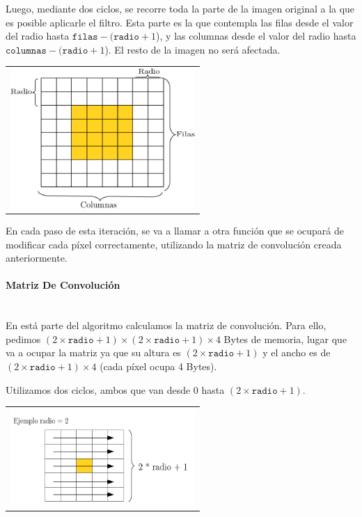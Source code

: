       Luego, mediante dos ciclos, se recorre toda la parte de la imagen original a la que es posible aplicarle el filtro. Esta parte es la que contempla las filas desde el valor del radio hasta $\mathtt{filas} - (\mathtt{radio} + 1$), y las columnas desde el valor del radio hasta $\mathtt{columnas} - (\mathtt{radio} + 1$). El resto de la imagen no será afectada. 

        {\centering \begin{tabular}{c}
          \includegraphics[width=7cm]{./imagenes/1.png} \\
        \end{tabular}}

      En cada paso de esta iteración, se va a llamar a otra función que se ocupará de modificar cada píxel correctamente, utilizando la matriz de convolución creada anteriormente. 

      \paragraph{Matriz De Convolución} \mbox{} \\
        En está parte del algoritmo calculamos la matriz de convolución. Para ello, pedimos $(2 \times \mathtt{radio} + 1) \times (2 \times \mathtt{radio} + 1) \times 4$ Bytes de memoria, lugar que va a ocupar la matriz ya que su altura es $(2 \times \mathtt{radio} + 1)$ y el ancho es de $(2 \times \mathtt{radio} + 1) \times 4$ (cada píxel ocupa 4 Bytes).
        
        Utilizamos dos ciclos, ambos que van desde 0 hasta $(2 \times \mathtt{radio} + 1)$. 
        
        {\centering \begin{tabular}{c}
          \includegraphics[width=7cm]{./imagenes/2.png} \\
        \end{tabular}}

